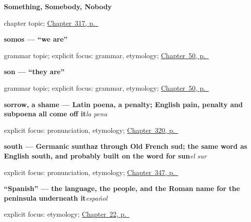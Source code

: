 \noindent\begin{minipage}[t]{\linewidth}
\raggedright
\textbf{Something, Somebody, Nobody}\par
\footnotesize chapter topic; \hyperref[ch:algo-y-nadie]{Chapter~317, p.~\pageref*{ch:algo-y-nadie}}
\end{minipage}\par\smallskip

\noindent\begin{minipage}[t]{\linewidth}
\raggedright
\textbf{somos — \textquotedblleft{}we are\textquotedblright{}}\par
\footnotesize grammar topic; explicit focus: grammar, etymology; \hyperref[ch:spanish-ser-plural]{Chapter~50, p.~\pageref*{ch:spanish-ser-plural}}
\end{minipage}\par\smallskip

\noindent\begin{minipage}[t]{\linewidth}
\raggedright
\textbf{son — \textquotedblleft{}they are\textquotedblright{}}\par
\footnotesize grammar topic; explicit focus: grammar, etymology; \hyperref[ch:spanish-ser-plural]{Chapter~50, p.~\pageref*{ch:spanish-ser-plural}}
\end{minipage}\par\smallskip

\noindent\begin{minipage}[t]{\linewidth}
\raggedright
\textbf{sorrow, a shame — Latin poena, a penalty; English pain, penalty and subpoena all come off it}\enspace\emph{la pena}\par
\footnotesize explicit focus: pronunciation, etymology; \hyperref[ch:favor-y-culpa]{Chapter~320, p.~\pageref*{ch:favor-y-culpa}}
\end{minipage}\par\smallskip

\noindent\begin{minipage}[t]{\linewidth}
\raggedright
\textbf{south — Germanic sunthaz through Old French sud; the same word as English south, and probably built on the word for sun}\enspace\emph{el sur}\par
\footnotesize explicit focus: pronunciation, etymology; \hyperref[ch:el-norte-y-el-sur]{Chapter~347, p.~\pageref*{ch:el-norte-y-el-sur}}
\end{minipage}\par\smallskip

\noindent\begin{minipage}[t]{\linewidth}
\raggedright
\textbf{\textquotedblleft{}Spanish\textquotedblright{} — the language, the people, and the Roman name for the peninsula underneath it}\enspace\emph{español}\par
\footnotesize explicit focus: etymology; \hyperref[ch:spanish-espanol]{Chapter~22, p.~\pageref*{ch:spanish-espanol}}
\end{minipage}\par\smallskip

